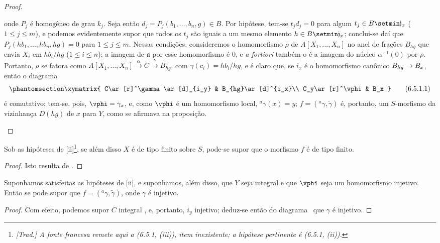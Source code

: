 \documentclass[oneside]{amsart}
\makeatletter
\renewcommand{\leq}{\leqslant}
\newcommand{\ega@arrow}[2]{\mathchoice{#1}{#2}{#2}{#2}}
\renewcommand{\to}{\ega@arrow{\longrightarrow}{\rightarrow}}
\newcommand{\oldpage}[2][]{{\marginnote{\normalfont\textbf{#1}~|~#2}}\ignorespaces}
\let\EGAOriginalLabel\label
\renewcommand{\label}[1]{\phantomsection\EGAOriginalLabel{#1}}
\makeatother
\begin{document}
\begin{proof}
\begin{enumerate}
\[    \]
    onde $P_j$ é homogêneo de grau $k_j$.
    Seja então $d_j=P_j(b_1,\ldots,b_n,g)\in B$.
    Por hipótese, tem-se $t_jd_j=0$ para algum $t_j\in B\setmin\mathfrak{j}_x$ ($1\leq j\leq m$), e podemos evidentemente supor que todos os $t_j$
\oldpage[I]{151}
    são iguais a um mesmo elemento $h\in B\setmin\mathfrak{j}_x$;
    conclui-se daí que $P_j(hb_1,\ldots,hb_n,hg)=0$ para $1\leq j\leq m$.
    Nessas condições, consideremos o homomorfismo $\rho$ de $A[X_1,\ldots,X_n]$ no anel de frações $B_{hg}$ que envia $X_i$ em $hb_i/hg$ ($1\leq i\leq n$);
    a imagem de $\mathfrak{a}$ por esse homomorfismo é $0$, e \emph{a fortiori} também o é a imagem do núcleo $\alpha^{-1}(0)$ por $\rho$.
    Portanto, $\rho$ se fatora como $A[X_1,\ldots,X_n]\xrightarrow{\alpha}C\xrightarrow{\gamma}B_{hg}$, com $\gamma(c_i)=hb_i/hg$, e é claro que, se $i_x$ é o homomorfismo canônico $B_{hg}\to B_x$, então o diagrama
    \[
    \label{I.6.5.1.1}
      \xymatrix{
        C\ar[r]^\gamma\ar[d]_{i_y} &
        B_{hg}\ar[d]^{i_x}\\
        C_y\ar[r]^\vphi &
        B_x
      }
      \tag{6.5.1.1}
    \]
    é comutativo; tem-se, pois, $\vphi=\gamma_x$, e, como $\vphi$ é um homomorfismo local, $^a\gamma(x)=y$;
    $f=({}^a\gamma,\widetilde{\gamma})$ é, portanto, um $S$-morfismo da vizinhança $D(hg)$ de $x$ para $Y$, como se afirmava na proposição.
\end{enumerate}
\end{proof}

\begin{corollary}[6.5.2]
\label{I.6.5.2}
Sob as hipóteses de [ii]\footnote{\emph{[Trad.] A fonte francesa remete aqui a (6.5.1, (iii)), item inexistente; a hipótese pertinente é (6.5.1, (ii)).}}, se além disso $X$ é de tipo finito sobre $S$, pode-se supor que o morfismo $f$ é de tipo finito.
\end{corollary}

\begin{proof}
Isto resulta de .
\end{proof}

\begin{corollary}[6.5.3]
\label{I.6.5.3}
Suponhamos satisfeitas as hipóteses de [ii], e suponhamos, além disso, que $Y$ seja integral e que $\vphi$ seja um homomorfismo injetivo.
Então se pode supor que $f=({}^a\gamma,\widetilde{\gamma})$, onde $\gamma$ é injetivo.
\end{corollary}

\begin{proof}
Com efeito, podemos supor $C$ integral , e, portanto, $i_y$ injetivo; deduz-se então do diagrama~ que $\gamma$ é injetivo.
\end{proof}
\end{document}
